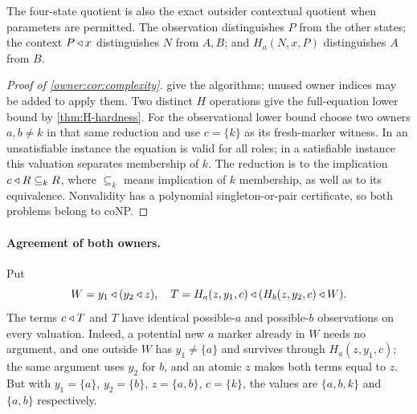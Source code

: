 The four-state quotient
is also the exact outsider contextual quotient when parameters are permitted. The observation distinguishes $P$ from the other states; the context $P\mathbin{\triangleleft} x$ distinguishes $N$ from $A,B$; and $H_a(N,x,P)$ distinguishes $A$ from $B$.

\begin{proof}[Proof of \cref{owner:cor:complexity}]
 give the algorithms; unused
owner indices may be added to apply them. Two distinct $H$ operations
give the full-equation lower bound by \cref{thm:H-hardness}.
For the observational lower bound choose two owners $a,b\ne k$ in that
same reduction and use $c=\{k\}$ as its fresh-marker witness. In an
unsatisfiable instance the equation is valid for all roles; in a
satisfiable instance this valuation separates membership of $k$.
The reduction is to the implication $c\mathbin{\triangleleft} R\subseteq_k R$, where
$\subseteq_k$ means implication of $k$ membership, as well as to its
equivalence. Nonvalidity has a polynomial singleton-or-pair certificate,
so both problems belong to coNP.
\end{proof}

\paragraph{Agreement of both owners.}
Put
\[
 W=y_1\mathbin{\triangleleft}(y_2\mathbin{\triangleleft} z),\quad
 T=H_a(z,y_1,c)\mathbin{\triangleleft}(H_b(z,y_2,c)\mathbin{\triangleleft} W).
\]
The terms $c\mathbin{\triangleleft} T$ and $T$ have identical possible-$a$ and possible-$b$ observations on every valuation. Indeed, a potential new $a$ marker already in $W$ needs no argument, and one outside $W$ has $y_1\ne\{a\}$ and survives through $H_a(z,y_1,c)$; the same argument uses $y_2$ for $b$, and an atomic $z$ makes both terms equal to $z$. But
with $y_1=\{a\}$, $y_2=\{b\}$, $z=\{a,b\}$, $c=\{k\}$, the values are $\{a,b,k\}$ and $\{a,b\}$ respectively.


